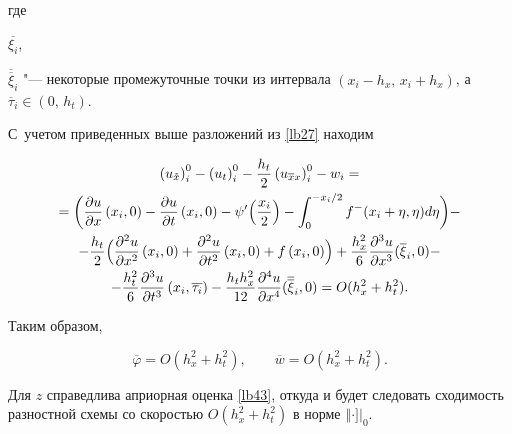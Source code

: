 где 

$\overline{\xi_i}$,

$\overline{\overline{\xi}}_i$ "--- некоторые промежуточные точки из интервала $(x_i-h_x,\,x_i+h_x)$, а~$\overline{\tau}_i \in (0,\,h_t)$. 

С~учетом приведенных выше разложений из \eqref{lb27} находим

\begin{multline}

\left(u_{\mathring{x}}\right)_{i}^{0}-\left(u_{t}\right)_{i}^{0}-

\frac{h_t}{2} \left(u_{\overline{x}x}\right)_{i}^{0}-w_i=

\\

=\biggl(\frac{\partial u}{\partial x}\left(x_i,0\right)-\frac{\partial u}{\partial t}\left(x_i,0\right)-\psi'\Bigl(\frac{x_i}{2}\Bigr)-

\int _{0}^{{-x_i}/{2}}f^{-}(x_i+\eta,\eta)d\eta \biggr)-

\\

-\frac{h_t}{2}

\Bigl(\frac{\partial^2 u}{\partial x^2}\left(x_i,0\right)+

\frac{\partial^2 u}{\partial t^2}\left(x_i,0\right)+f\left(x_i,0\right) \Bigr)+

\frac{h_x^2}{6}\frac{\partial^3 u}{\partial x^3}

(\overline{\xi}_i, 0 )-

\\

-\frac{h_t^2}{6}\frac{\partial^3 u}{\partial t^3}\left(x_i,\overline{\tau_i}\right)-\frac{h_t h_x^2}{12}\frac{\partial^4 u}{\partial x^4}

(\overline{\overline{\xi}}_i,0 )=O(h_x^2+h_t^2 ).

\end{multline} 

Таким образом,

$$

\overline{\varphi}=O\left(h_x^2+h_t^2\right),\qquad \overline{w}=O\left(h_x^2+h_t^2\right).

$$



Для $z$ справедлива априорная оценка \eqref{lb43}, откуда и будет следовать сходимость разностной схемы со скоростью $O\left(h_x^2+h_t^2\right)$ в норме $\left\Vert \cdot \right.]|_{0}$. 





